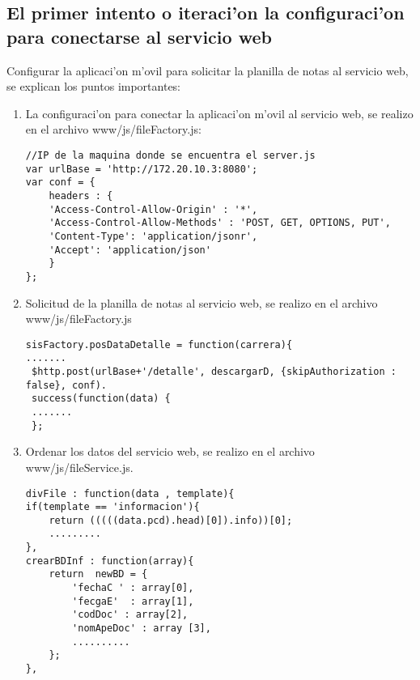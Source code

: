 \subsection{El primer intento o iteraci'on la configuraci'on para conectarse al servicio web}
Configurar la aplicaci'on m'ovil para solicitar la planilla de notas al servicio web, se explican los puntos importantes:

\begin{enumerate}
\item La configuraci'on para conectar la aplicaci'on m'ovil al servicio web, se realizo en el archivo www/js/fileFactory.js: 
\begin{verbatim}
//IP de la maquina donde se encuentra el server.js
var urlBase = 'http://172.20.10.3:8080';
var conf = {
	headers : {
	'Access-Control-Allow-Origin' : '*',
    'Access-Control-Allow-Methods' : 'POST, GET, OPTIONS, PUT',
    'Content-Type': 'application/jsonr',
    'Accept': 'application/json'
    } 
};
\end{verbatim}

\item Solicitud de la planilla de notas al servicio web, se realizo en el archivo www/js/fileFactory.js

\begin{verbatim}
sisFactory.posDataDetalle = function(carrera){
.......
 $http.post(urlBase+'/detalle', descargarD, {skipAuthorization : false}, conf).
 success(function(data) {
 .......
 }; 
\end{verbatim}

\item Ordenar los datos del servicio web, se realizo en el archivo www/js/fileService.js.

\begin{verbatim}
divFile : function(data , template){
if(template == 'informacion'){
   	return (((((data.pcd).head)[0]).info))[0];
	.........
},
crearBDInf : function(array){
	return  newBD = {
    	'fechaC ' : array[0],
        'fecgaE'  : array[1],
        'codDoc' : array[2],
        'nomApeDoc' : array [3],
        ..........
    };
},
\end{verbatim}
\end{enumerate}
